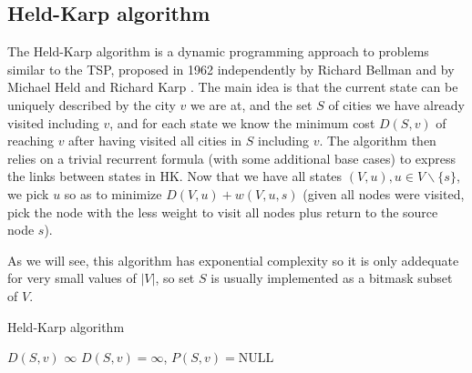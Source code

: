 \subsection{Held-Karp algorithm} \label{algorithm-tsp-heldkarp}
The Held-Karp algorithm is a \gls{dynamic programming} approach to problems similar to the \acrlong*{TSP}, proposed in 1962 independently by Richard Bellman \cite{bellman62} and by Michael Held and Richard Karp \cite{held-karp62}. The main idea is that the current state can be uniquely described by the city $v$ we are at, and the set $S$ of cities we have already visited including $v$, and for each state we know the minimum cost $D(S,v)$ of reaching $v$ after having visited all cities in $S$ including $v$. The algorithm then relies on a trivial recurrent formula (with some additional base cases) to express the links between states in \textsc{HK}. Now that we have all states $(V, u), u \in V \backslash \{s\}$, we pick $u$ so as to minimize $D(V, u)+w(V,u,s)$ (given all nodes were visited, pick the node with the less weight to visit all nodes plus return to the source node $s$).\par
As we will see, this algorithm has exponential complexity so it is only addequate for very small values of $|V|$, so set $S$ is usually implemented as a bitmask subset of $V$.
\begin{algorithm}[H]
    \caption{Held-Karp algorithm}
    \label{alg:held-karp}
    \begin{algorithmic}[1]
             \Return $D(S,v)$
            \EndIf
             \Return $\infty$ 
            \EndIf
                  
                \Else             { \Return {$\infty$} } 
                \EndIf
            \EndIf
                     
                \EndIf
            \EndFor
            \State {}
        \EndFunction
             {$D(S,v)=\infty$, $P(S,v)=\text{NULL}$}
            \EndFor
                \EndIf
            \EndFor
            \Repeat 
            \State {}
        \EndFunction
    \end{algorithmic}
\end{algorithm}
